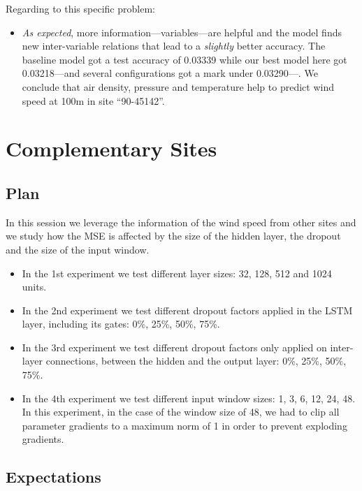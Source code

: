 \documentclass[]{article}
\begin{document}
	Regarding to this specific problem:
	
	\begin{itemize}
		\item \emph{As expected}, more information---variables---are helpful and the model finds new inter-variable relations that lead to a \emph{slightly} better accuracy. The baseline model got a test accuracy of 0.03339 while our best model here got 0.03218---and several configurations got a mark under 0.03290---. We conclude that air density, pressure and temperature help to predict wind speed at 100m in site ``90-45142''.
	\end{itemize}
	
	\section{Complementary Sites}
	
	\subsection{Plan}
	
	In this session we leverage the information of the wind speed from other sites and we study how the MSE is affected by the size of the hidden layer, the dropout and the size of the input window.
	
	\begin{itemize}
		\item In the 1st experiment we test different layer sizes: 32, 128, 512 and 1024 units.
		
		\item In the 2nd experiment we test different dropout factors applied in the LSTM layer, including its gates: 0\%, 25\%, 50\%, 75\%.
		
		\item In the 3rd experiment we test different dropout factors only applied on inter-layer connections, between the hidden and the output layer: 0\%, 25\%, 50\%, 75\%.
		
		\item In the 4th experiment we test different input window sizes: 1, 3, 6, 12, 24, 48. In this experiment, in the case of the window size of 48, we had to clip all parameter gradients to a maximum norm of 1 in order to prevent exploding gradients.
	\end{itemize}
	
	\subsection{Expectations}
	
\end{document}
